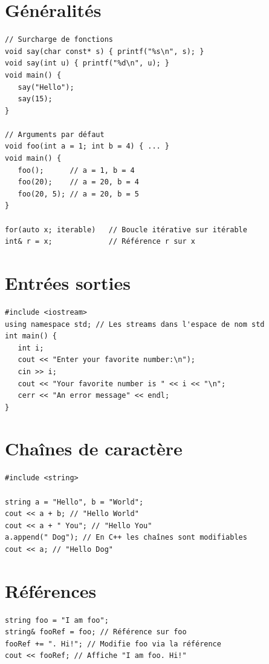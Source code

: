 \documentclass{article}
\begin{document}
\begin{multicols*}{3}
\section*{Généralités}

\begin{lstlisting}
// Surcharge de fonctions
void say(char const* s) { printf("%s\n", s); }
void say(int u) { printf("%d\n", u); }
void main() {
   say("Hello");
   say(15);
}

// Arguments par défaut
void foo(int a = 1; int b = 4) { ... }
void main() {
   foo();      // a = 1, b = 4
   foo(20);    // a = 20, b = 4
   foo(20, 5); // a = 20, b = 5
}

for(auto x; iterable)   // Boucle itérative sur itérable
int& r = x;             // Référence r sur x
\end{lstlisting}

\section*{Entrées sorties}

\begin{lstlisting}
#include <iostream>
using namespace std; // Les streams dans l'espace de nom std
int main() {
   int i;
   cout << "Enter your favorite number:\n");
   cin >> i;
   cout << "Your favorite number is " << i << "\n";
   cerr << "An error message" << endl;
}
\end{lstlisting}

\section*{Chaînes de caractère}

\begin{lstlisting}
#include <string>

string a = "Hello", b = "World";
cout << a + b; // "Hello World"
cout << a + " You"; // "Hello You"
a.append(" Dog"); // En C++ les chaînes sont modifiables
cout << a; // "Hello Dog"
\end{lstlisting}

\section*{Références}

\begin{lstlisting}
string foo = "I am foo";
string& fooRef = foo; // Référence sur foo
fooRef += ". Hi!"; // Modifie foo via la référence
cout << fooRef; // Affiche "I am foo. Hi!"


\end{lstlisting}
\end{multicols*}
\end{document}
